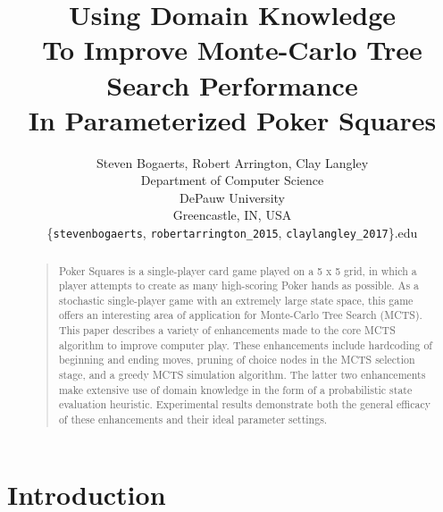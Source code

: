\documentclass[letterpaper]{article}
\begin{document}
%
\title{Using Domain Knowledge\\To Improve Monte-Carlo Tree Search Performance\\In Parameterized Poker Squares}    %
\author{Steven Bogaerts, Robert Arrington, Clay Langley\\
Department of Computer Science\\
DePauw University\\
Greencastle, IN, USA\\
\{{\tt stevenbogaerts}, {\tt robertarrington\_2015}, {\tt claylangley\_2017}\}{\tt@depauw.edu}
}
\maketitle
\begin{abstract}
\begin{quote}
Poker Squares is a single-player card game played on a 5 x 5 grid, in which a player attempts to create as many high-scoring Poker hands as possible. As a stochastic single-player game with an extremely large state space, this game offers an interesting area of application for Monte-Carlo Tree Search (MCTS). This paper describes a variety of enhancements made to the core MCTS algorithm to improve computer play. These enhancements include hardcoding of beginning and ending moves, pruning of choice nodes in the MCTS selection stage, and a greedy MCTS simulation algorithm. The latter two enhancements make extensive use of domain knowledge in the form of a probabilistic state evaluation heuristic. Experimental results demonstrate both the general efficacy of these enhancements and their ideal parameter settings.
\end{quote}
\end{abstract}

\section{Introduction}

\end{document}
